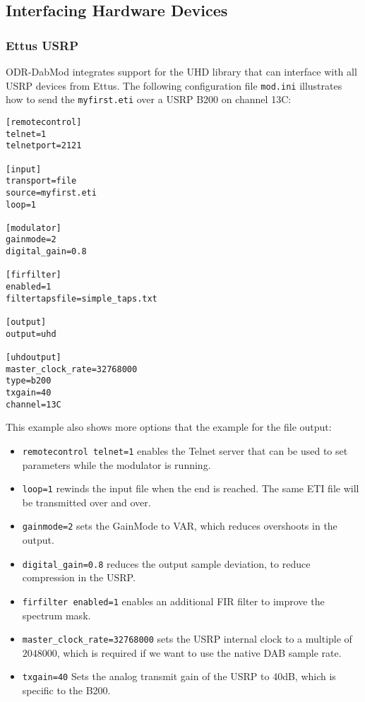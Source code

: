\subsection{Interfacing Hardware Devices}
\subsubsection{Ettus USRP}
ODR-DabMod integrates support for the UHD library that can interface with all
USRP devices from Ettus. The following configuration file \texttt{mod.ini}
illustrates how to send the \texttt{myfirst.eti} over a USRP B200 on channel
13C:

\begin{lstlisting}
[remotecontrol]
telnet=1
telnetport=2121

[input]
transport=file
source=myfirst.eti
loop=1

[modulator]
gainmode=2
digital_gain=0.8

[firfilter]
enabled=1
filtertapsfile=simple_taps.txt

[output]
output=uhd

[uhdoutput]
master_clock_rate=32768000
type=b200
txgain=40
channel=13C
\end{lstlisting}

This example also shows more options that the example for the file output:

\begin{itemize}
    \item \texttt{remotecontrol telnet=1} enables the Telnet server that can be
        used to set parameters while the modulator is running.
    \item \texttt{loop=1} rewinds the input file when the end is reached. The
        same ETI file will be transmitted over and over.
    \item \texttt{gainmode=2} sets the GainMode to VAR, which reduces
        overshoots in the output.
    \item \texttt{digital\_gain=0.8} reduces the output sample deviation, to
        reduce compression in the USRP.
    \item \texttt{firfilter enabled=1} enables an additional FIR filter to
        improve the spectrum mask.
    \item \texttt{master\_clock\_rate=32768000} sets the USRP internal clock to
        a multiple of $2048000$, which is required if we want to use the native
        DAB sample rate.
    \item \texttt{txgain=40} Sets the analog transmit gain of the USRP to 40dB,
        which is specific to the B200.
\end{itemize}

